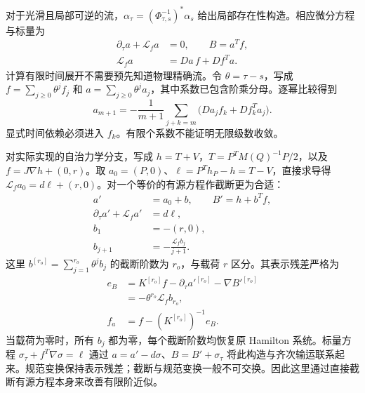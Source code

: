 对于光滑且局部可逆的流，$\alpha_\tau=(\Phi_{\tau,s}^{-1})^*\alpha_s$ 给出局部存在性构造。相应微分方程与标量为
\begin{equation}
 \begin{aligned}
 \partial_\tau a+\mathcal L_fa&=0,\qquad B=a^Tf,\\
 \mathcal L_fa&=Da\,f+Df^Ta.
\end{aligned}
 \label{eq:th-homogeneous}
\end{equation}
计算有限时间展开不需要预先知道物理精确流。令 $\theta=\tau-s$，写成 $f=\sum_{j\ge0}\theta^j f_j$ 和 $a=\sum_{j\ge0}\theta^j a_j$，其中系数已包含阶乘分母。逐幂比较得到
\begin{equation}
 a_{m+1}=-\frac1{m+1}\sum_{j+k=m}
       \bigl(Da_j f_k+Df_k^Ta_j\bigr).
 \label{eq:th-time-recursion}
\end{equation}
显式时间依赖必须进入 $f_k$。有限个系数不能证明无限级数收敛。

对实际实现的自治力学分支，写成
$h=T+V$，$T=P^TM(Q)^{-1}P/2$，以及 $f=J\nabla h+(0,r)$。取 $a_0=(P,0)$、$\ell=P^Th_P-h=T-V$，直接求导得 $\mathcal L_fa_0=d\ell+(r,0)$。对一个等价的有源方程作截断更为合适：
\begin{equation}
 \begin{aligned}
 a'&=a_0+b,\qquad B'=h+b^Tf,\\
 \partial_\tau a'+\mathcal L_fa'&=d\ell,\\
 b_1&=-(r,0),\\
 b_{j+1}&=-\frac{\mathcal L_fb_j}{j+1}.
\end{aligned}
 \label{eq:th-source}
\end{equation}
这里 $b^{[r_o]}=\sum_{j=1}^{r_o}\theta^jb_j$ 的截断阶数为 $r_o$，与载荷 $r$ 区分。其表示残差严格为
\begin{equation}
 \begin{aligned}
 e_B&=K^{[r_o]}f-\partial_\tau a'^{[r_o]}-\nabla B'^{[r_o]}\\
    &=-\theta^{r_o}\mathcal L_fb_{r_o},\\
 f_a&=f-(K^{[r_o]})^{-1}e_B .
\end{aligned}
 \label{eq:th-source-residual}
\end{equation}
当载荷为零时，所有 $b_j$ 都为零，每个截断阶数均恢复原 Hamilton 系统。标量方程 $\sigma_\tau+f^T\nabla\sigma=\ell$ 通过 $a=a'-d\sigma$、$B=B'+\sigma_\tau$ 将此构造与齐次输运联系起来。规范变换保持表示残差；截断与规范变换一般不可交换。因此这里通过直接截断有源方程本身来改善有限阶近似。

